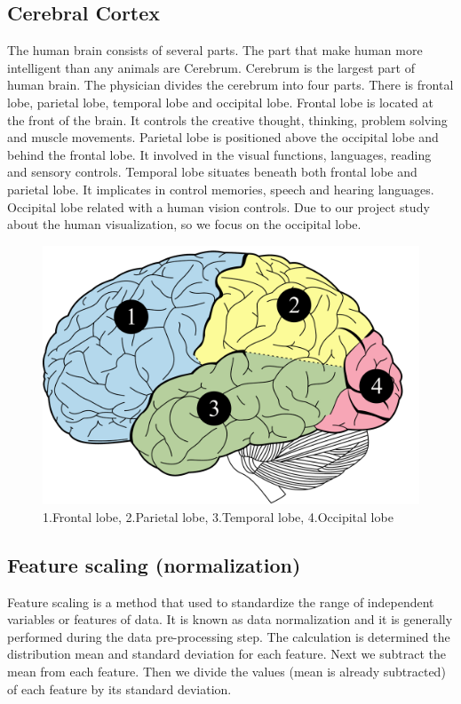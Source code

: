 \subsection{Cerebral Cortex}

\hspace{1.5cm} The human brain consists of several parts. The part that make human more intelligent than any animals are Cerebrum. Cerebrum is the largest part of human brain. The physician divides the cerebrum into four parts. There is frontal lobe, parietal lobe, temporal lobe and occipital lobe. Frontal lobe is located at the front of the brain. It controls the creative thought, thinking, problem solving and muscle movements. Parietal lobe is positioned above the occipital lobe and behind the frontal lobe. It involved in the visual functions, languages, reading and sensory controls. Temporal lobe situates beneath both frontal lobe and parietal lobe. It implicates in control memories, speech and hearing languages. Occipital lobe related with a human vision controls. Due to our project study about the human visualization, so we focus on the occipital lobe.

\begin{figure}[h]
	\centering
	\includegraphics[scale = 0.32]{chapter3/33.pdf}
	\caption{1.Frontal lobe, 2.Parietal lobe, 3.Temporal lobe, 4.Occipital lobe}
\end{figure}

\newpage
\subsection{Feature scaling (normalization)}

\hspace{1.5cm} Feature scaling is a method that used to standardize the range of independent variables or features of data. It is known as data normalization and it is generally performed during the data pre-processing step. The calculation is determined the distribution mean and standard deviation for each feature. Next we subtract the mean from each feature. Then we divide the values (mean is already subtracted) of each feature by its standard deviation.\cite{ref10}

